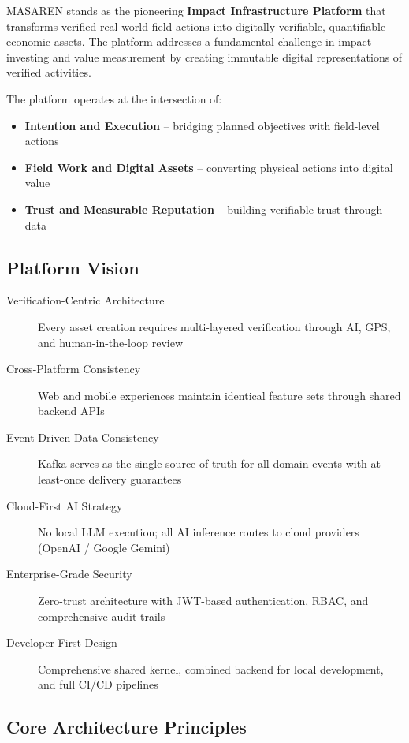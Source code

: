 \documentclass[11pt,a4paper]{article}
\begin{document}
MASAREN stands as the pioneering \textbf{Impact Infrastructure Platform} that transforms verified real-world field actions into digitally verifiable, quantifiable economic assets. The platform addresses a fundamental challenge in impact investing and value measurement by creating immutable digital representations of verified activities.

The platform operates at the intersection of:
\begin{itemize}
  \item \textbf{Intention and Execution} -- bridging planned objectives with field-level actions
  \item \textbf{Field Work and Digital Assets} -- converting physical actions into digital value
  \item \textbf{Trust and Measurable Reputation} -- building verifiable trust through data
\end{itemize}

\subsection{Platform Vision}

\begin{description}
  \item[Verification-Centric Architecture] Every asset creation requires multi-layered verification through AI, GPS, and human-in-the-loop review
  \item[Cross-Platform Consistency] Web and mobile experiences maintain identical feature sets through shared backend APIs
  \item[Event-Driven Data Consistency] Kafka serves as the single source of truth for all domain events with at-least-once delivery guarantees
  \item[Cloud-First AI Strategy] No local LLM execution; all AI inference routes to cloud providers (OpenAI / Google Gemini)
  \item[Enterprise-Grade Security] Zero-trust architecture with JWT-based authentication, RBAC, and comprehensive audit trails
  \item[Developer-First Design] Comprehensive shared kernel, combined backend for local development, and full CI/CD pipelines
\end{description}

\subsection{Core Architecture Principles}
\end{document}
